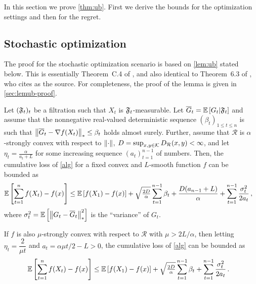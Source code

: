 
In this section we prove \cref{thm:ub}. First we derive the bounds for the optimization settings and then for the regret. 

\subsection{Stochastic optimization}

The proof for the stochastic optimization scenario is based on \cref{lem:ub} stated below.
This is essentially Theorem~C.4 of \citet{MahdaviPhd:2014}, and also identical to Theorem~6.3 of \citet{Bu:Convex14}, who cites \citet{Dekel:minibatch12} as the source. For completeness, the proof of the lemma is given in \cref{sec:lemub-proof}.
\begin{lemma}
\label{lem:ub}
Let $({\mathfrak{F}}_t)_{t}$ be a filtration such that $X_t$ is ${{\mathfrak{F}}}_t$-measurable.
Let $\overline G_t = \mathbb{E}\left[G_t|{{\mathfrak{F}}}_t\right]$
and assume that the nonnegative real-valued deterministic sequence $(\beta_t)_{1\le t\le n}$ is such that
$\left\|\overline G_t - \nabla {f}(X_t)\right\|_* \le \beta_t$ holds almost surely.
Further, assume that $\mathcal{R}$ is $\alpha$-strongly convex with respect to $\left\|\cdot\right\|$, $D=\sup_{x,y\in \mathcal{K}} D_{\mathcal{R}}(x,y) < \infty$,  and let $\eta_t = \frac{\alpha}{a_t+L}$ for some increasing
sequence $(a_t)_{t=1}^{n-1}$ of numbers. Then, the cumulative loss of \cref{alg} for a fixed convex and $L$-smooth  function $f$ can be bounded as
\begin{align*}
\mathbb{E}\left[ \sum_{t=1}^n {f}(X_t) - {f}(x) \right]
\le 	 \mathbb{E}\left[{f}(X_1)-{f}(x)\right]+
  \sqrt{\tfrac{2D}{\alpha}} \sum_{t=1}^{n-1} \beta_t
 +\frac{D(a_{n-1}+L)}{\alpha} +
	  \sum_{t=1}^{n-1}\frac{\sigma_t^2}{2a_t}\,,
\end{align*}
where $\sigma_t^2 = \mathbb{E}\left[ \left\|G_t-\overline G_t\right\|_*^2\right]$ is the ``variance'' of $G_t$.

If ${{f}}$ is also $\mu$-strongly convex with respect to $\mathcal{R}$ with $\mu > 2L/\alpha$, then letting $\eta_t = \dfrac{2}{\mu t}$ and $a_t = \alpha \mu t/2-L > 0$, the cumulative loss of  \cref{alg} can be bounded as
\begin{align*}
 \mathbb{E}\left[ \sum_{t=1}^n {f}(X_t) - {f}(x) \right]
\le 	 \mathbb{E}\left[{f}(X_1)-{f}(x)\right]+
 \sqrt{\tfrac{2D}{\alpha}} \sum_{t=1}^{n-1} \beta_t
 +\sum_{t=1}^{n-1}\frac{\sigma_t^2}{2a_t}\,.
\end{align*}
\end{lemma}


